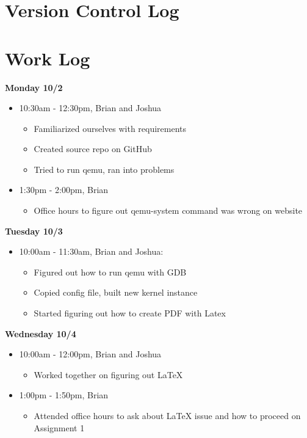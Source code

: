 \documentclass[letterpaper, onecolumn, draftclsnofoot, 10pt, compsoc]{IEEEtran}
\begin{document}
\section{Version Control Log}
    
    
\section{Work Log}
    \textbf{Monday 10/2}
        \begin{itemize}
            \item 10:30am - 12:30pm, Brian and Joshua
            \begin{itemize}
                \item Familiarized ourselves with requirements
                \item Created source repo on GitHub
                \item Tried to run qemu, ran into problems
            \end{itemize}
            \item 1:30pm - 2:00pm, Brian
                \begin{itemize}
                    \item Office hours to figure out qemu-system command was wrong on website
                \end{itemize}
        \end{itemize}
    \textbf{Tuesday 10/3}
        \begin{itemize}
            \item 10:00am - 11:30am, Brian and Joshua:
            \begin{itemize}
                \item Figured out how to run qemu with GDB
                \item Copied config file, built new kernel instance
                \item Started figuring out how to create PDF with Latex
            \end{itemize}
        \end{itemize}
    \textbf{Wednesday 10/4}
        \begin{itemize}
            \item 10:00am - 12:00pm, Brian and Joshua
            \begin{itemize}
                \item Worked together on figuring out LaTeX
            \end{itemize}
            \item 1:00pm - 1:50pm, Brian
                \begin{itemize}
                    \item Attended office hours to ask about LaTeX issue and how to proceed on Assignment 1
                \end{itemize}
        \end{itemize}
\end{document}
